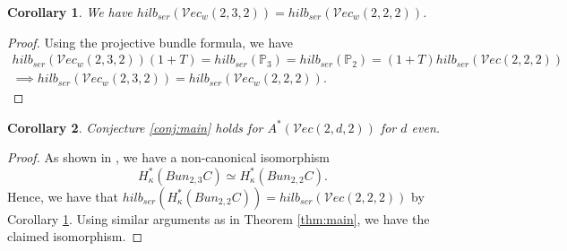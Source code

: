 \documentclass[11pt]{amsart}
\numberwithin{theorem}{section}
\newtheorem{corollary}{Corollary}[section]
\numberwithin{lemma}{section}
\theoremstyle{definition}
\newcommand{\p}{\mathbb{P}}
\newcommand{\ve}{\mathcal{V}ec}
\newcommand{\ka}{\kappa}
\begin{document}
\begin{corollary}\label{cor:hecke}
We have $hilb_{ser}(\ve_w(2,3,2)) = hilb_{ser}(\ve_w(2,2,2))$.
\end{corollary}
\begin{proof}
Using the projective bundle formula, we have 
\begin{gather*}hilb_{ser}(\ve_w(2,3,2))(1+T) = hilb_{ser}(\p_3)=hilb_{ser}(\p_2) = (1+T)hilb_{ser}(\ve(2,2,2))\\
	\implies hilb_{ser}(\ve_w(2,3,2)) = hilb_{ser}(\ve_w(2,2,2)).\end{gather*}
\end{proof}
\begin{corollary}\label{cor:conj}
Conjecture \ref{conj:main} holds for $A^*(\ve(2,d,2))$ for $d$ even.
\end{corollary}
\begin{proof}
As shown in \cite[Theorem 4.7]{heinloth}, we have a non-canonical isomorphism
$$H^*_\ka(Bun_{2,3}C)\simeq H^*_\ka(Bun_{2,2}C).$$
Hence, we have that $hilb_{ser}(H^*_\ka(Bun_{2,2}C))=hilb_{ser}(\ve(2,2,2))$ by Corollary \ref{cor:hecke}. Using similar arguments as in Theorem \ref{thm:main}, we have the claimed isomorphism.
\end{proof}
\end{document}
